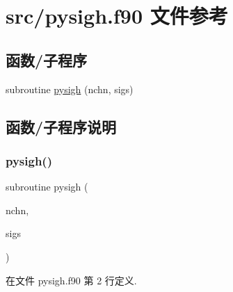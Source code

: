 \hypertarget{pysigh_8f90}{}\section{src/pysigh.f90 文件参考}
\label{pysigh_8f90}
\subsection*{函数/子程序}
\begin{DoxyCompactItemize}
\item 
subroutine \mbox{\hyperlink{pysigh_8f90_a6090ead4366be41cbc8112be6b047172}{pysigh}} (nchn, sigs)
\end{DoxyCompactItemize}


\subsection{函数/子程序说明}
\mbox{\label{pysigh_8f90_a6090ead4366be41cbc8112be6b047172}} 
\subsubsection{\texorpdfstring{pysigh()}{pysigh()}}
{\footnotesize\ttfamily subroutine pysigh (\begin{DoxyParamCaption}\item[{}]{nchn,  }\item[{}]{sigs }\end{DoxyParamCaption})}



在文件 pysigh.\+f90 第 2 行定义.

